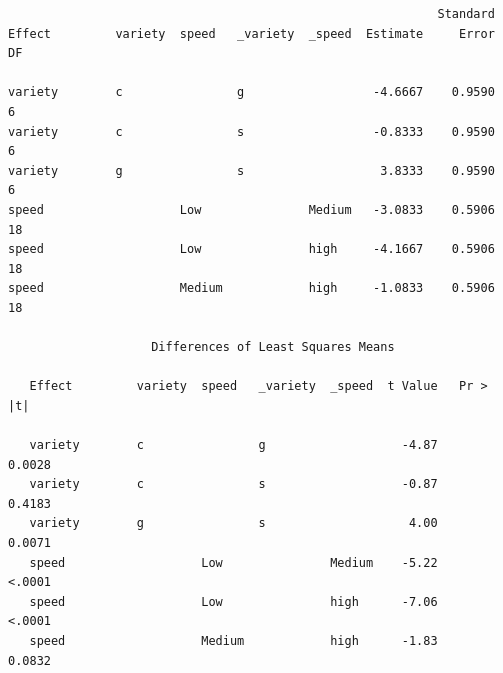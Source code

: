 \begin{small}
\begin{verbatim}
                                                            Standard
Effect         variety  speed   _variety  _speed  Estimate     Error    DF

variety        c                g                  -4.6667    0.9590     6
variety        c                s                  -0.8333    0.9590     6
variety        g                s                   3.8333    0.9590     6
speed                   Low               Medium   -3.0833    0.5906    18
speed                   Low               high     -4.1667    0.5906    18
speed                   Medium            high     -1.0833    0.5906    18

                    Differences of Least Squares Means
 
   Effect         variety  speed   _variety  _speed  t Value   Pr > |t|

   variety        c                g                   -4.87     0.0028
   variety        c                s                   -0.87     0.4183
   variety        g                s                    4.00     0.0071
   speed                   Low               Medium    -5.22     <.0001
   speed                   Low               high      -7.06     <.0001
   speed                   Medium            high      -1.83     0.0832
\end{verbatim}
\end{small}

